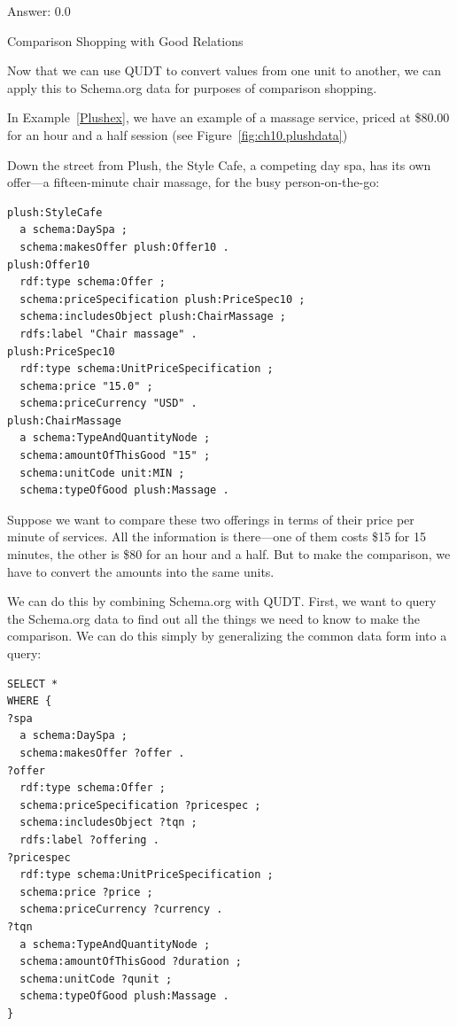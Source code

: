 Answer: 0.0

\begin{challenge}{Comparison Shopping with Good Relations}
\label{chal:38}

Now that we can use QUDT to convert values from one unit to another, we
can apply this to Schema.org data for purposes of comparison
shopping.

In Example~\ref{Plushex}, we have an example of a massage
service, priced at \$80.00 for an hour and a half session (see Figure~\ref{fig:ch10.plushdata})

Down the street from Plush, the Style Cafe, a competing day spa, has 
its own offer---a
fifteen-minute chair massage, for the busy person-on-the-go:

\begin{lstlisting}
plush:StyleCafe
  a schema:DaySpa ;
  schema:makesOffer plush:Offer10 .
plush:Offer10
  rdf:type schema:Offer ;
  schema:priceSpecification plush:PriceSpec10 ;
  schema:includesObject plush:ChairMassage ;
  rdfs:label "Chair massage" .
plush:PriceSpec10
  rdf:type schema:UnitPriceSpecification ;
  schema:price "15.0" ;
  schema:priceCurrency "USD" .
plush:ChairMassage
  a schema:TypeAndQuantityNode ;
  schema:amountOfThisGood "15" ;
  schema:unitCode unit:MIN ;  
  schema:typeOfGood plush:Massage .
\end{lstlisting}



Suppose we want to compare these two offerings in terms of their price
per minute of services. All the information is there---one of them costs
\$15 for 15 minutes, the other is \$80 for an hour and a half. But to
make the comparison, we have to convert the amounts into the same units.

We can do this by combining Schema.org with QUDT. First, we want to
query the Schema.org data to find out all the things we need to know
to make the comparison. We can do this simply by generalizing the common
data form into a query:

\begin{lstlisting}
SELECT * 
WHERE {
?spa
  a schema:DaySpa ;
  schema:makesOffer ?offer .
?offer
  rdf:type schema:Offer ;
  schema:priceSpecification ?pricespec ;
  schema:includesObject ?tqn ;
  rdfs:label ?offering .
?pricespec
  rdf:type schema:UnitPriceSpecification ;
  schema:price ?price ;
  schema:priceCurrency ?currency .
?tqn
  a schema:TypeAndQuantityNode ;
  schema:amountOfThisGood ?duration ;
  schema:unitCode ?qunit ;  
  schema:typeOfGood plush:Massage .
}
\end{lstlisting}


\end{challenge}

